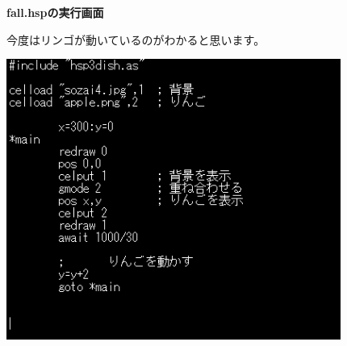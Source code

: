\documentclass[a4paper,dvipdfmx]{jarticle}
\begin{document}
\bigskip


\bigskip


\bigskip

{\bfseries
fall.hspの実行画面}


\bigskip


\bigskip


\bigskip


\bigskip

今度はリンゴが動いているのがわかると思います。


\bigskip


\bigskip



\begin{center}
\includegraphics[width=10.954cm,height=9.213cm]{text04-img/text04-img020.png}

\end{center}

\bigskip


\bigskip


\bigskip


\bigskip


\bigskip


\bigskip


\bigskip


\bigskip


\bigskip


\bigskip


\bigskip


\bigskip


\bigskip


\bigskip


\bigskip


\bigskip
\end{document}
